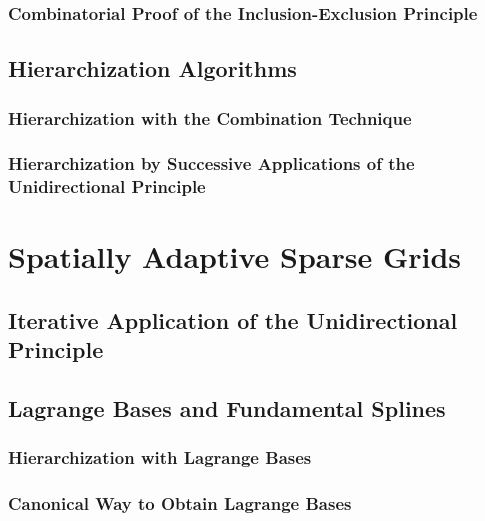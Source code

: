 
\subsubsection{Combinatorial Proof of the Inclusion-Exclusion Principle}


\subsection{Hierarchization Algorithms}


\subsubsection{Hierarchization with the Combination Technique}


\subsubsection{%
  Hierarchization by Successive Applications of the Unidirectional Principle%
}


\section{Spatially Adaptive Sparse Grids}


\subsection{Iterative Application of the Unidirectional Principle}


\subsection{Lagrange Bases and Fundamental Splines}


\subsubsection{Hierarchization with Lagrange Bases}


\subsubsection{Canonical Way to Obtain Lagrange Bases}

